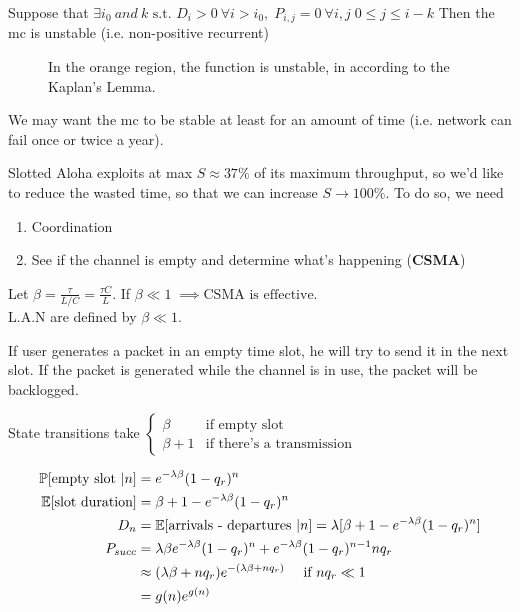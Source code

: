 \begin{lemma}
Suppose that $\exists i_0 ~and ~k \text{ s.t. } D_i>0 ~\forall i> i_0 , \; P_{i,j} = 0 ~\forall i,j \; 0 \le j \le i-k$
Then the \gls{mc} is unstable (i.e. non-positive recurrent)

\begin{figure}
	\centering
	
	\caption{In the orange region, the function is unstable, in according to the Kaplan's Lemma.}
	\label{fig:kaplan}
\end{figure}

We may want the \gls{mc} to be stable at least for an amount of time (i.e. network can fail once or twice a year).
\end{lemma}

Slotted Aloha exploits at max $S \approx 37 \%$ of its maximum throughput, so we'd like to reduce the wasted time,
so that we can increase $S \to 100\%$. To do so, we need
\begin{enumerate}
	\item Coordination
	\item See if the channel is empty and determine what's happening (\textbf{CSMA})
\end{enumerate}

Let $\beta = \frac{\tau}{L/C} = \frac{\tau C}{L}$. If $\beta \ll 1 \; \implies \text{CSMA is effective}$. \\
L.A.N are defined by $\beta \ll 1$.

If user generates a packet in an empty time slot, he will try to send it in the next slot. If the packet is generated while the channel is in use, the packet will be backlogged.

State transitions take $\begin{cases}
	\beta & \text{if empty slot} \\
	\beta + 1 & \text{if there's a transmission}
\end{cases}$

\begin{equation}\begin{split}
	\mathbb{P}[\text{empty slot }|n] &= e^{-\lambda \beta} (1-q_r)^n \\
	\mathbb{E}[\text{slot duration}] &= \beta + 1 - e^{-\lambda\beta} (1-q_r)^n \\
	D_n &= \mathbb{E}[\text{arrivals - departures }|n ]= \lambda [\beta + 1 - e^{-\lambda \beta} (1-q_r)^n ]\\
	P_{succ} &= \lambda \beta e^{-\lambda \beta} (1-q_r)^n + e^{-\lambda \beta} (1-q_r)^{n-1} n q_r \\
	&\approx (\lambda \beta + n q_r) e^{-(\lambda \beta + n q_r)} \quad \text{ if } n q_r \ll 1 \\
	&= g(n) e^{g(n)}
\end{split}\end{equation}

